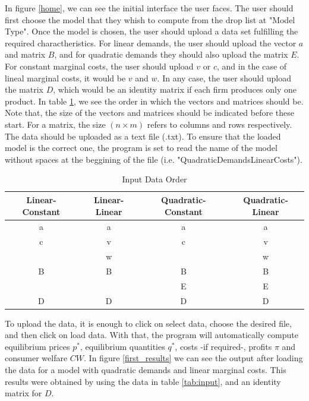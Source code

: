 \documentclass[12pt]{article}
\begin{document}
In figure \ref{home}, we can see the initial interface the user faces. The user should first choose the model that they whish to compute from the drop list at "Model Type". Once the model is chosen, the user should upload a data set fulfilling the required charactheristics. For linear demands, the user should upload the vector $a$ and matrix $B$, and for quadratic demands they should also upload the matrix $E$. For constant marginal costs, the user should upload $v$ or $c$, and in the case of lineal marginal costs, it would be $v$ and $w$. In any case, the user should upload the matrix $D$, which would be an identity matrix if each firm produces only one product. In table \ref{tab:sample}, we see the order in which the vectors and matrices should be. Note that, the size of the vectors and matrices should be indicated before these start. For a matrix, the size $(n \times m)$ refers to columns and rows respectively. The data should be uploaded as a text file (.txt). To ensure that the loaded model is the correct one, the program is set to read the name of the model without spaces at the beggining of the file (i.e. "QuadraticDemandsLinearCosts").

\begin{table}
\begin{center}
\begin{tabular}{c|c|c|c} 
Linear-Constant&Linear-Linear&Quadratic-Constant&Quadratic-Linear\\
\hline
\hline
a&a&a&a\\
\hline
c&v&c&v\\
\hline
&w&&w\\
\hline
B&B&B&B\\
\hline
&&E&E\\
\hline
D&D&D&D\\
\hline
\end{tabular}
\caption{\label{tab:sample}Input Data Order}
\end{center}
\end{table}

To upload the data, it is enough to click on select data, choose the desired file, and then click on load data. With that, the program will automatically compute equilibrium prices $p^*$, equilibrium quantities $q^*$, costs -if required-, profits $\pi$ and consumer welfare $CW$. In figure \ref{first_results} we can see the output after loading the data for a model with quadratic demands and linear marginal costs. This results were obtained by using the data in table \ref{tab:input}, and an identity matrix for $D$.
\end{document}
